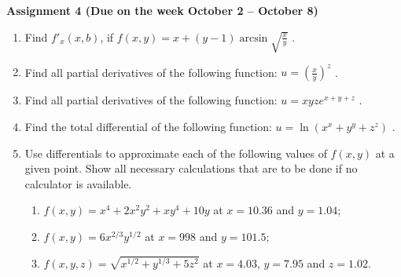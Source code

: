 \documentclass{article}
\begin{document}
\fontsize{14}{21}
\selectfont
\centerline{\textbf{Assignment 4 (Due on the week October 2 -- October 8)}}
\fontsize{12}{18}
\selectfont

\begin{enumerate}

\item Find $f'_x(x,b)$, if $f(x,y)= x+(y-1)\arcsin \sqrt{\frac xy}$ .

\item Find all partial derivatives of the following function: $u=\left(\frac xy\right)^z$ .

\item Find all partial derivatives of the following function: $u=xyz e^{x+y+z}$ .

\item Find the total differential of the following function: $u=\ln (x^x+y^y+z^z)$ .

\item Use differentials to approximate each of the following values of $f(x,y)$ at a given point. Show all necessary calculations that are to be done if no calculator is available.
\begin{enumerate}
\item $f(x,y)=x^4+2x^2y^2+xy^4+10y$ at $x=10.36$ and $y=1.04$;
\item $f(x,y)=6x^{2/3}y^{1/2}$  at $x=998$ and $y=101.5$;
\item $f(x,y,z)=\sqrt{x^{1/2}+y^{1/3}+5z^2}$ at $x=4.03$, $y=7.95$ and $z=1.02$.
\end{enumerate}
\end{enumerate}
\end{document}
